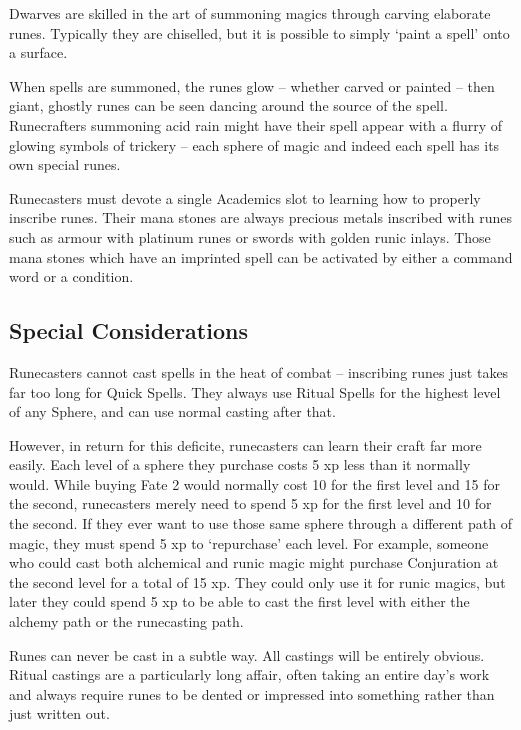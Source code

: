 \begin{multicols}{2}

\noindent Dwarves are skilled in the art of summoning magics through carving elaborate runes. Typically they are chiselled, but it is possible to simply `paint a spell' onto a surface.

When spells are summoned, the runes glow -- whether carved or painted -- then giant, ghostly runes can be seen dancing around the source of the spell.
Runecrafters summoning acid rain might have their spell appear with a flurry of glowing symbols of trickery -- each sphere of magic and indeed each spell has its own special runes.

Runecasters must devote a single Academics slot to learning how to properly inscribe runes. Their mana stones are always precious metals inscribed with runes such as armour with platinum runes or swords with golden runic inlays. Those mana stones which have an imprinted spell can be activated by either a command word or a condition.

\subsection{Special Considerations}

Runecasters cannot cast spells in the heat of combat -- inscribing runes just takes far too long for Quick Spells. They always use Ritual Spells for the highest level of any Sphere, and can use normal casting after that.

However, in return for this deficite, runecasters can learn their craft far more easily. Each level of a sphere they purchase costs 5 \gls{xp} less than it normally would. While buying Fate 2 would normally cost 10 for the first level and 15 for the second, runecasters merely need to spend 5 \gls{xp} for the first level and 10 for the second. If they ever want to use those same sphere through a different path of magic, they must spend 5 \gls{xp} to `repurchase' each level. For example, someone who could cast both alchemical and runic magic might purchase Conjuration at the second level for a total of 15 \gls{xp}. They could only use it for runic magics, but later they could spend 5 \gls{xp} to be able to cast the first level with either the alchemy path or the runecasting path.

Runes can never be cast in a subtle way. All castings will be entirely obvious. Ritual castings are a particularly long affair, often taking an entire day's work and always require runes to be dented or impressed into something rather than just written out.


\end{multicols}
